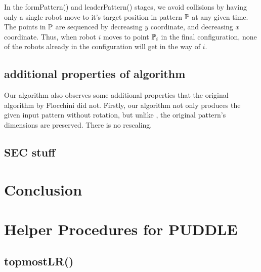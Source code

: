 \documentclass[preprint,10pt]{elsarticle}
\begin{document}
		In the formPattern() and leaderPattern() stages, we avoid collisions by having only a single robot move to
		it's target position in pattern $\mathbb{P}$ at any given time. The points in $\mathbb{P}$ are sequenced by 
		decreasing $y$ coordinate, and decreasing $x$ coordinate. Thus, when robot $i$ moves to point $\mathbb{P}_i$ in 
		the final configuration, none of the robots already in the configuration will get in the way of $i$. \\

		\subsection{additional properties of algorithm} 
		Our algorithm also observes some additional properties that the original algorithm by Flocchini did not.
		Firstly, our algorithm not only produces the given input pattern without rotation, but unlike \cite{flocchini12distrib},
		the original pattern's dimensions are preserved. There is no rescaling.


%

\subsection{SEC stuff } 

\section{Conclusion}
\label{conc}


\appendix
\section{Helper Procedures for PUDDLE}
\subsection{topmostLR()} 
\end{document}
